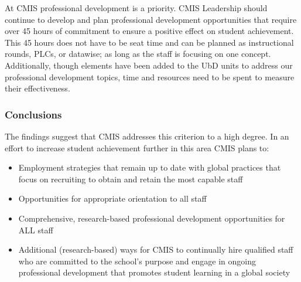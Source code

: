 \begin{findings}

At CMIS professional development is a priority. CMIS Leadership should continue to develop and plan professional development opportunities that require over 45 hours of commitment to ensure a positive effect on student achievement. This 45 hours does not have to be seat time and can be planned as instructional rounds, PLCs, or datawise;  as long as the staff is focusing on one concept. Additionally, though elements have been added to the UbD units to address our professional development topics, time and resources need to be spent  to measure their effectiveness. 
\end{findings}

\subsubsection{Conclusions}

The findings suggest that CMIS addresses this criterion to a high degree. In an effort to increase student achievement further in this area CMIS plans to:


\begin{itemize}
\item Employment strategies that remain up to date with global practices that focus on recruiting to obtain and retain the most capable staff
\item Opportunities for appropriate orientation to all staff 
\item Comprehensive, research-based professional development opportunities for ALL staff
\end{itemize}

\begin{itemize}
\item Additional (research-based) ways for CMIS to continually hire qualified staff who are committed to the school’s purpose and engage in ongoing professional development that promotes student learning in a global society
\end{itemize}



